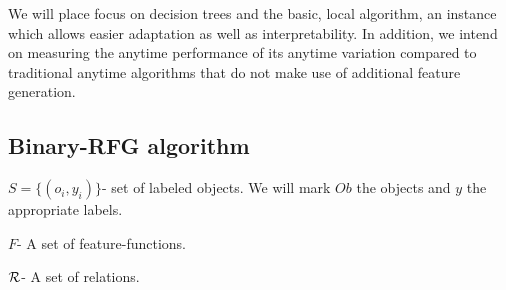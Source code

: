 \documentclass[12pt, a4paper]{article}
\theoremstyle{definition}
\begin{document}
We will place focus on decision trees and the basic, local algorithm, an instance which allows easier adaptation as well as interpretability.
In addition, we intend on measuring the anytime performance of its anytime variation compared to traditional anytime algorithms that do not make use of additional feature generation.




\begin{appendices}
\pagebreak

%
%
%
%
%
%
%
%

\section{Binary-RFG algorithm} \label{app:2}
\begin{algorithm}[H]
$S=\{(o_{i},y_{i})\}$- set of labeled objects. We will mark $Ob$ the objects and $y$ the appropriate labels.

$F$- A set of feature-functions.

$\cal R$- A set of relations.


\end{algorithm}
\end{appendices}
\end{document}
